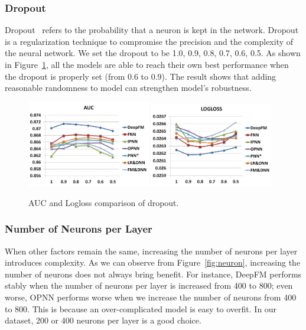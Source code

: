 \subsubsection{Dropout}\label{sec:exp:hyper:drop}

Dropout~\cite{dropout14} refers to the probability that a neuron is kept in the network. Dropout is a regularization technique to compromise the precision and the complexity of the neural network. We set the dropout to be 1.0, 0.9, 0.8, 0.7, 0.6, 0.5. As shown in Figure~\ref{fig:drop}, all the models are able to reach their own best performance when the dropout is properly set (from 0.6 to 0.9). The result shows that adding reasonable randomness to model can strengthen model's robustness.

\begin{figure}[ht]
\setlength{\abovecaptionskip}{0pt}%
\setlength{\belowcaptionskip}{-10pt}
\centering
\begin{minipage}[b]{0.5\textwidth}
\includegraphics[width=0.48\textwidth]{img/drop-auc.png}
\includegraphics[width=0.48\textwidth]{img/drop-logloss.png}
\end{minipage}
\caption{\footnotesize{AUC and Logloss comparison of dropout.}}\label{fig:drop}
\end{figure}

\subsubsection{Number of Neurons per Layer}\label{sec:exp:hyper:neuron}

When other factors remain the same, increasing the number of neurons per layer introduces complexity. As we can observe from Figure~\ref{fig:neuron}, increasing the number of neurons does not always bring benefit. For instance, DeepFM performs stably when the number of neurons per layer is increased from 400 to 800; even worse, OPNN performs worse when we increase the number of neurons from 400 to 800. This is because an over-complicated model is easy to overfit. In our dataset, 200 or 400 neurons per layer is a good choice.

